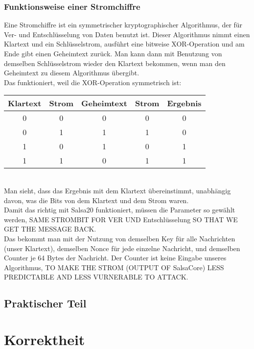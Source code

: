 \documentclass[course=erap]{aspdoc}
\begin{document}
\subsubsection{Funktionsweise einer Stromchiffre}
Eine Stromchiffre ist ein symmetrischer kryptographischer Algorithmus, der für Ver- und Entschlüsselung von Daten benutzt ist. 
Dieser Algorithmus nimmt einen Klartext und ein Schlüsselstrom, ausführt eine bitweise XOR-Operation und am Ende gibt einen Geheimtext zurück. 
Man kann dann mit Benutzung von demselben Schlüsselstrom wieder den Klartext bekommen, wenn man den Geheimtext zu diesem Algorithmus übergibt.
\vspace{1mm}
\\Das funktioniert, weil die XOR-Operation symmetrisch ist:
\begin{table}[!h]
    \begin{tabular}{|c|c|c|c|c|}
    \hline
    Klartext & Strom & Geheimtext & Strom & Ergebnis \\
    \hline
    0 & 0 & 0 & 0 & 0 \\
    0 & 1 & 1 & 1 & 0 \\
    1 & 0 & 1 & 0 & 1 \\
    1 & 1 & 0 & 1 & 1 \\
    \hline
    \end{tabular}
\end{table}
\\
Man sieht, dass das Ergebnis mit dem Klartext übereinstimmt, unabhängig davon, was die Bits von dem Klartext und dem Strom waren.
\vspace{3mm}
\\
Damit das richtig mit Salsa20 funktioniert, müssen die Parameter so gewählt werden, SAME STROMBIT FOR VER UND Entschlüsselung 
SO THAT WE GET THE MESSAGE BACK.
\\
Das bekommt man mit der Nutzung von demselben Key für alle Nachrichten (unser Klartext), demselben Nonce für jede einzelne Nachricht, und demselben Counter je 64 Bytes der Nachricht. 
Der Counter ist keine Eingabe unseres Algorithmus, TO MAKE THE STROM (OUTPUT OF SalsaCore) LESS PREDICTABLE AND LESS VURNERABLE TO ATTACK.


\subsection{Praktischer Teil}
\section{Korrektheit}
\end{document}
